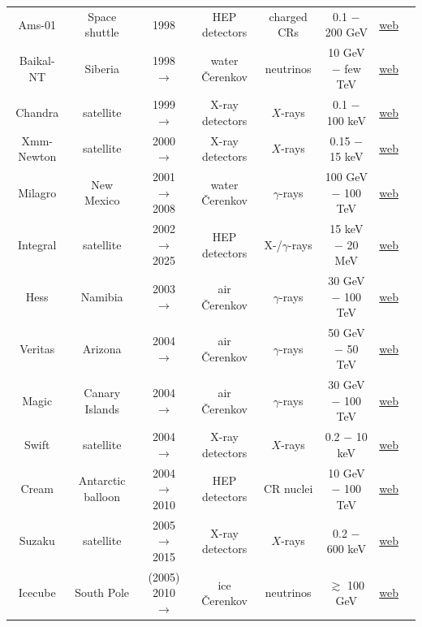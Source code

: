 \begin{table}[p]
\begin{center}
{\begin{tabular}{cccccccc}
{\sc Ams-01} & Space shuttle & 1998 & HEP detectors  & charged CRs & 0.1 $-$ 200 GeV& \href{http://www.ams02.org/what-is-ams/ams01/}{web}  & \cite{Ams-01} \\
{\sc Baikal-NT} & Siberia & 1998 $\to$ & water \v Cerenkov & neutrinos & 10 GeV $-$ few TeV  & \href{http://baikalweb.jinr.ru}{web} & \cite{Baikal} \\
{\sc Chandra} & satellite & 1999 $\to$  & X-ray detectors & $X$-rays & 0.1 $-$ 100 keV & \href{http://chandra.harvard.edu}{web} & \cite{Chandra} \\
{\sc Xmm-Newton} & satellite & 2000 $\to$  & X-ray detectors & $X$-rays & 0.15 $-$ 15 keV & \href{https://www.cosmos.esa.int/web/xmm-newton}{web} & \cite{Xmm-Newton} \\
{\sc Milagro} & New Mexico & 2001 $\to$ 2008 & water \v Cerenkov & $\gamma$-rays & 100 GeV $-$ 100 TeV & \href{http://umdgrb.umd.edu/cosmic/milagro.html}{web} & \cite{Milagro} \\
{\sc Integral} & satellite & 2002 $\to$ 2025 & HEP detectors & X-/$\gamma$-rays & 15 keV $-$ 20 MeV & \href{http://sci.esa.int/integral/}{web} & \cite{Integral} \\
{\sc Hess} & Namibia & 2003 $\to$ & air \v Cerenkov & $\gamma$-rays & 30 GeV $-$ 100 TeV & \href{http://www.mpi-hd.mpg.de/hfm/HESS/}{web} & \cite{Hess} \\
{\sc Veritas} & Arizona & 2004 $\to$ & air \v Cerenkov & $\gamma$-rays & 50 GeV $-$ 50 TeV & \href{http://veritas.sao.arizona.edu}{web}  & \cite{Veritas} \\
{\sc Magic} & Canary Islands & 2004 $\to$ & air \v Cerenkov & $\gamma$-rays & 30 GeV $-$ 100 TeV & \href{http://wwwmagic.mppmu.mpg.de}{web}  & \cite{Magic} \\
{\sc Swift} & satellite & 2004 $\to$ & X-ray detectors & $X$-rays & 0.2 $-$ 10 keV & \href{https://swift.gsfc.nasa.gov/about_swift/xrt_desc.html}{web}  & \cite{Swift} \\
{\sc Cream} & Antarctic balloon & 2004 $\to$ 2010 & HEP detectors & CR nuclei & 10 GeV $-$ 100 TeV & \href{http://cosmicray.umd.edu/cream/}{web}  & \cite{Cream} \\
{\sc Suzaku} & satellite & 2005 $\to$ 2015 & X-ray detectors & $X$-rays & 0.2 $-$ 600 keV & \href{http://www.astro.isas.jaxa.jp/suzaku/}{web}  & \cite{Suzaku} \\
{\sc Icecube} & South Pole & (2005) 2010 $\to$ & ice \v Cerenkov & neutrinos & $\gtrsim$ 100 GeV &  \href{http://icecube.wisc.edu}{web} & \cite{Icecube} \\

\end{tabular}}
\end{center}
\end{table}
